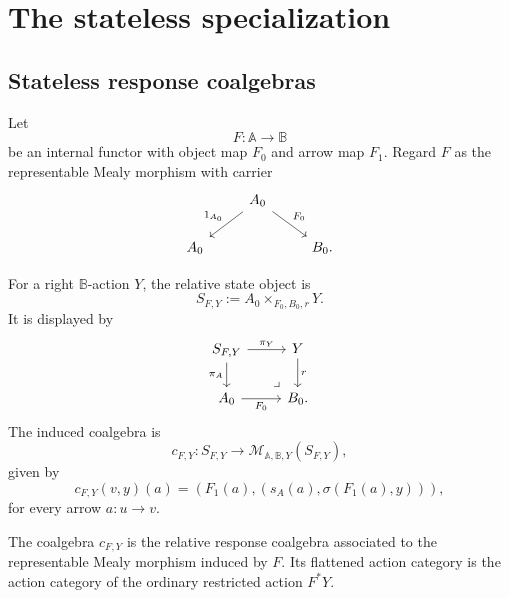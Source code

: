 \section{The stateless specialization}
\label{sec:poly-relative-stateless-specialization}

\subsection{Stateless response coalgebras}
\label{subsec:poly-relative-stateless-response-coalgebras}

Let
\[
F:\mathbb A\to\mathbb B
\]
be an internal functor with object map \(F_0\) and arrow map \(F_1\).  Regard
\(F\) as the representable Mealy morphism with carrier
\[
\begin{tikzcd}
&
A_0
  \arrow[dl,"1_{A_0}"']
  \arrow[dr,"F_0"]
&
\\
A_0 && B_0 .
\end{tikzcd}
\]

For a right \(\mathbb B\)-action \(Y\), the relative state object is
\[
S_{F,Y}:=A_0\times_{F_0,B_0,r}Y.
\]
It is displayed by
\[
\begin{tikzcd}
S_{F,Y}
  \arrow[r,"\pi_Y"]
  \arrow[d,"\pi_A"']
&
Y
  \arrow[d,"r"]
\\
A_0
  \arrow[r,"F_0"']
&
B_0
\arrow[ul,phantom,very near start,"\lrcorner"] .
\end{tikzcd}
\]
The induced coalgebra is
\[
c_{F,Y}:
S_{F,Y}\to
\mathcal M_{\mathbb A,\mathbb B,Y}(S_{F,Y}),
\]
given by
\[
c_{F,Y}(v,y)(a)
=
\left(
F_1(a),
\left(
s_A(a),
\sigma(F_1(a),y)
\right)
\right),
\]
for every arrow \(a:u\to v\).

\begin{proposition}
\label{prop:poly-relative-stateless-response-coalgebra}
The coalgebra \(c_{F,Y}\) is the relative response coalgebra associated to the
representable Mealy morphism induced by \(F\).  Its flattened action category
is the action category of the ordinary restricted action \(F^\ast Y\).
\end{proposition}

